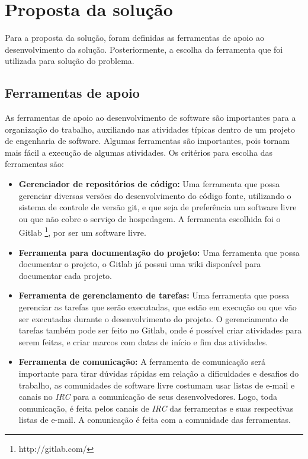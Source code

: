 \section{Proposta da solução}
\label{section:construcao}

Para a proposta da solução, foram definidas as ferramentas
de apoio ao desenvolvimento da solução. Posteriormente, a escolha da ferramenta
que foi utilizada para solução do problema.

\subsection{Ferramentas de apoio}

As ferramentas de apoio ao desenvolvimento de software são importantes para a
organização do trabalho, auxiliando nas atividades típicas dentro de um projeto
de engenharia de software. Algumas ferramentas são importantes, pois tornam mais fácil
a execução de algumas atividades. Os critérios para escolha das ferramentas são:

\begin{itemize}
  \item \textbf{Gerenciador de repositórios de código:} Uma ferramenta que
  possa gerenciar diversas versões do desenvolvimento do código fonte, utilizando
  o sistema de controle de versão git, e que seja de preferência um software livre
  ou que não cobre o serviço de hospedagem. A ferramenta escolhida foi o Gitlab 
  \footnote{http://gitlab.com/}, por ser um software livre.
  \item \textbf{Ferramenta para documentação do projeto:} Uma ferramenta que possa
  documentar o projeto, o Gitlab já possui uma wiki disponível para documentar 
  cada projeto.
  \item \textbf{Ferramenta de gerenciamento de tarefas:} Uma ferramenta que possa
  gerenciar as tarefas que serão executadas, que estão em execução ou que vão ser executadas
  durante o desenvolvimento do projeto. O gerenciamento de tarefas também pode ser
  feito no Gitlab, onde é possível criar atividades para serem feitas, e criar marcos
  com datas de início e fim das atividades.
  \item \textbf{Ferramenta de comunicação:} A ferramenta de comunicação será
  importante para tirar dúvidas rápidas em relação a dificuldades e desafios do trabalho, 
  as
  comunidades de software livre costumam usar listas de e-mail e canais no \textit{IRC}
  para a comunicação de seus desenvolvedores. Logo, toda comunicação, é feita
  pelos canais de \textit{IRC} das ferramentas e suas respectivas listas de e-mail. 
  A comunicação é feita com a comunidade das ferramentas.
\end{itemize}

